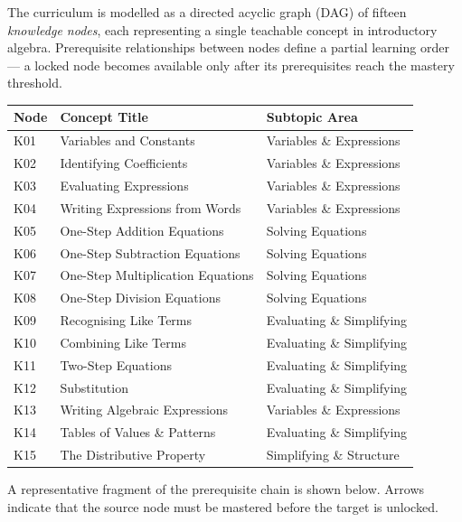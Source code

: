 \documentclass[12pt,a4paper]{article}
\begin{document}
The curriculum is modelled as a directed acyclic graph (DAG) of fifteen
\emph{knowledge nodes}, each representing a single teachable concept in
introductory algebra. Prerequisite relationships between nodes define a
partial learning order — a locked node becomes available only after its
prerequisites reach the mastery threshold.

\begin{center}
\begin{tabular}{lll}
  \toprule
  \textbf{Node} & \textbf{Concept Title} & \textbf{Subtopic Area} \\
  \midrule
  K01 & Variables and Constants           & Variables \& Expressions \\
  K02 & Identifying Coefficients          & Variables \& Expressions \\
  K03 & Evaluating Expressions            & Variables \& Expressions \\
  K04 & Writing Expressions from Words    & Variables \& Expressions \\
  K05 & One-Step Addition Equations       & Solving Equations \\
  K06 & One-Step Subtraction Equations    & Solving Equations \\
  K07 & One-Step Multiplication Equations & Solving Equations \\
  K08 & One-Step Division Equations       & Solving Equations \\
  K09 & Recognising Like Terms            & Evaluating \& Simplifying \\
  K10 & Combining Like Terms              & Evaluating \& Simplifying \\
  K11 & Two-Step Equations                & Evaluating \& Simplifying \\
  K12 & Substitution                      & Evaluating \& Simplifying \\
  K13 & Writing Algebraic Expressions     & Variables \& Expressions \\
  K14 & Tables of Values \& Patterns      & Evaluating \& Simplifying \\
  K15 & The Distributive Property         & Simplifying \& Structure \\
  \bottomrule
\end{tabular}
\end{center}

\bigskip

A representative fragment of the prerequisite chain is shown below.
Arrows indicate that the source node must be mastered before the target
is unlocked.
\end{document}
